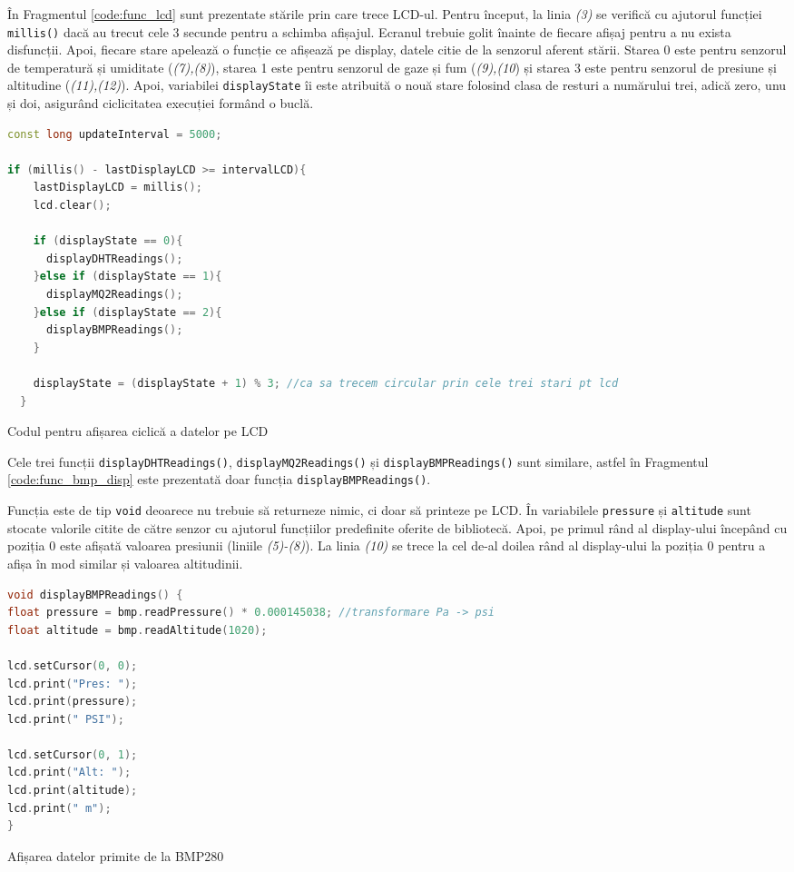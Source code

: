 În Fragmentul \ref{code:func_lcd} sunt prezentate stările prin care trece LCD-ul. Pentru început, la linia \textit{(3)} se verifică cu ajutorul funcției \texttt{millis()} dacă au trecut cele 3 secunde pentru a schimba afișajul. Ecranul trebuie golit înainte de fiecare afișaj pentru a nu exista disfuncții. Apoi, fiecare stare apelează o funcție ce afișează pe display, datele citie de la senzorul aferent stării. Starea 0 este pentru senzorul de temperatură și umiditate (\textit{(7),(8)}), starea 1 este pentru senzorul de gaze și fum (\textit{(9),(10}) și starea 3 este pentru senzorul de presiune și altitudine (\textit{(11),(12)}). Apoi, variabilei \texttt{displayState} îi este atribuită o nouă stare folosind clasa de resturi a numărului trei, adică zero, unu și doi, asigurând ciclicitatea execuției formând o buclă.

\begin{code}[H]
\begin{lstlisting}[language=C++]
const long updateInterval = 5000;

if (millis() - lastDisplayLCD >= intervalLCD){
    lastDisplayLCD = millis(); 
    lcd.clear(); 

    if (displayState == 0){
      displayDHTReadings();
    }else if (displayState == 1){
      displayMQ2Readings();
    }else if (displayState == 2){
      displayBMPReadings();
    }

    displayState = (displayState + 1) % 3; //ca sa trecem circular prin cele trei stari pt lcd
  }
\end{lstlisting}
\caption{Codul pentru afișarea ciclică a datelor pe LCD }
\label{code:func_lcd}
\end{code}

Cele trei funcții \texttt{displayDHTReadings()}, \texttt{displayMQ2Readings()} și \texttt{displayBMPReadings()} sunt similare, astfel în Fragmentul \ref{code:func_bmp_disp} este prezentată doar funcția \texttt{displayBMPReadings()}.

Funcția este de tip \texttt{void} deoarece nu trebuie să returneze nimic, ci doar să printeze pe LCD. În variabilele \texttt{pressure} și \texttt{altitude} sunt stocate valorile citite de către senzor cu ajutorul funcțiilor predefinite oferite de bibliotecă. Apoi, pe primul rând al display-ului începând cu poziția 0 este afișată valoarea presiunii (liniile \textit{(5)-(8)}). La linia \textit{(10)} se trece la cel de-al doilea rând al display-ului la poziția 0 pentru a afișa în mod similar și valoarea altitudinii.

\begin{code}[H]
\begin{lstlisting}[language=C++]
void displayBMPReadings() {
float pressure = bmp.readPressure() * 0.000145038; //transformare Pa -> psi
float altitude = bmp.readAltitude(1020);

lcd.setCursor(0, 0);
lcd.print("Pres: ");
lcd.print(pressure);
lcd.print(" PSI");

lcd.setCursor(0, 1);
lcd.print("Alt: ");
lcd.print(altitude);
lcd.print(" m");
}
\end{lstlisting}
\caption{Afișarea datelor primite de la BMP280}
\label{code:func_bmp_disp}
\end{code}


